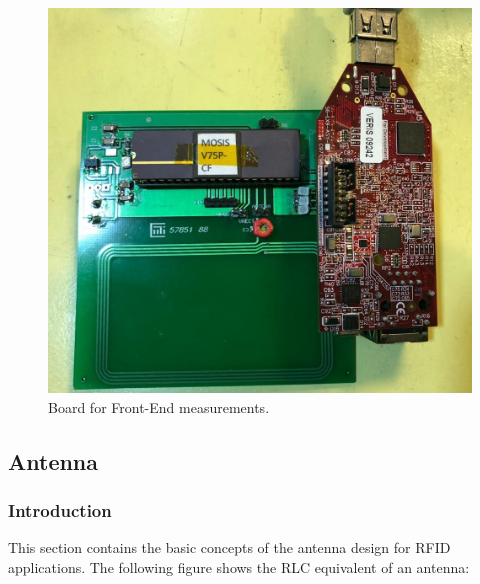 \documentclass{article} %
\begin{document}
\begin{multicols}{2}
\begin{figure}[H]
\centering
\includegraphics[scale=0.2]{Images/ImagenesTesina/500nm_Test_Shield.jpg}
\caption{Board for Front-End measurements.}
\label{fig:500nm_test_placa}
\end{figure}

\subsection{Antenna}
\subsubsection{Introduction}
This section contains the basic concepts of the antenna design for RFID applications. The following figure shows the RLC equivalent of an antenna:



\end{multicols}
\end{document}

